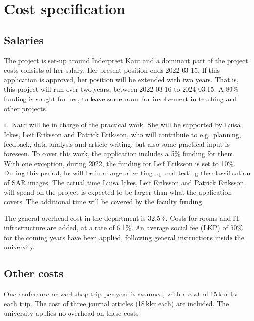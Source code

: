 \documentclass[12pt,oneside,a4paper]{article}
\begin{document}
\thispagestyle{empty}


\section*{Cost specification}

\subsection*{Salaries}
%
The project is set-up around Inderpreet Kaur and a dominant part of the
project costs consists of her salary. Her present position ends 2022-03-15. If
this application is approved, her position will be extended with two years.
That is, this project will run over two years, between 2022-03-16 to
2024-03-15. A 80\% funding is sought for her, to leave some room for involvement in 
teaching and other projects.

I.\ Kaur will be in charge of the practical work. She will be supported by
Luisa Ickes, Leif Eriksson and Patrick Eriksson, who will contribute to e.g.\
planning, feedback, data analysis and article writing, but also some practical
input is foreseen. To cover this work, the application includes a 5\% funding
for them. With one exception, during 2022, the funding for Leif Eriksson is set
to 10\%. During this period, he will be in charge of setting up and testing the
classification of SAR images. The actual time Luisa Ickes, Leif Eriksson and
Patrick Eriksson will spend on the project is expected to be larger than what
the application covers. The additional time will be covered by the faculty
funding.

The general overhead cost in the department is 32.5\%. Costs for rooms and IT
infrastructure are added, at a rate of 6.1\%. An average social fee (LKP) of
60\% for the coming years have been applied, following general instructions
inside the university.



\subsection*{Other costs}
%
One conference or workshop trip per year is assumed, with a cost of 15\,kkr for
each trip. The cost of three journal articles (18\,kkr each) are included. The
university applies no overhead on these costs.
\end{document}
